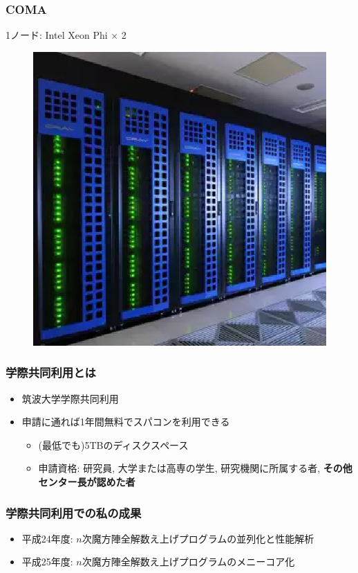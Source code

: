 \documentclass[dvipdfmx,20pt,notheorems,t]{beamer}
\begin{document}
\begin{frame}\frametitle{COMA}
\small
1ノード: Intel Xeon Phi $\times$ 2
\begin{figure}[htb]
\centering
\includegraphics[height=0.6\textheight]{coma.eps}
\end{figure}
\end{frame}

\begin{frame}\frametitle{学際共同利用とは}
\begin{itemize}
\item 筑波大学学際共同利用
\item 申請に通れば1年間無料でスパコンを利用できる
\begin{itemize}
\item (最低でも)5TBのディスクスペース
\item 申請資格: {\tiny 研究員, 大学または高専の学生, 研究機関に所属する者,} \textbf{その他センター長が認めた者}
\end{itemize}
\end{itemize}
\end{frame}

\begin{frame}\frametitle{学際共同利用での私の成果}
\begin{itemize}
\item 平成24年度: $n$次魔方陣全解数え上げプログラムの並列化と性能解析
\item 平成25年度: $n$次魔方陣全解数え上げプログラムのメニーコア化
\end{itemize}
\end{frame}
\end{document}
